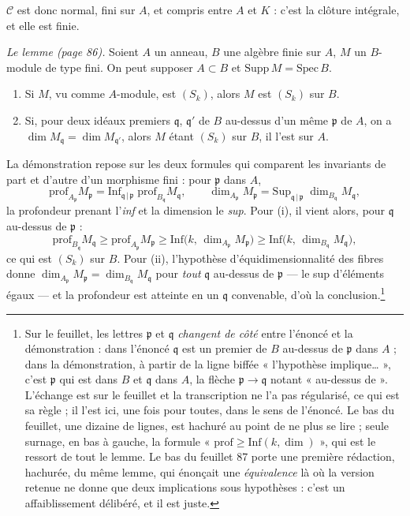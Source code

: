 \documentclass[11pt,a4paper]{article}
\begin{document}
$\mathcal{C}$ est donc normal, fini sur $A$, et compris entre $A$ et $K$ : c'est
la clôture intégrale, et elle est finie.

\emph{Le lemme (page 86).} Soient $A$ un anneau, $B$ une algèbre finie sur $A$,
$M$ un $B$-module de type fini. On peut supposer $A \subset B$ et
$\mathrm{Supp}\,M = \mathrm{Spec}\,B$.

\begin{enumerate}
  \item[(i)] Si $M$, vu comme $A$-module, est $(S_{k})$, alors $M$ est
  $(S_{k})$ sur $B$.
  \item[(ii)] Si, pour deux idéaux premiers $\mathfrak{q}$, $\mathfrak{q}'$ de
  $B$ au-dessus d'un même $\mathfrak{p}$ de $A$, on a $\dim M_{\mathfrak{q}} =
  \dim M_{\mathfrak{q}'}$, alors $M$ étant $(S_{k})$ sur $B$, il l'est sur $A$.
\end{enumerate}

La démonstration repose sur les deux formules qui comparent les invariants de
part et d'autre d'un morphisme fini : pour $\mathfrak{p}$ dans $A$,
\[
  \mathrm{prof}_{A_{\mathfrak{p}}} M_{\mathfrak{p}}
  = \mathrm{Inf}_{\mathfrak{q}\,|\,\mathfrak{p}}\;
    \mathrm{prof}_{B_{\mathfrak{q}}} M_{\mathfrak{q}} ,
  \qquad
  \dim_{A_{\mathfrak{p}}} M_{\mathfrak{p}}
  = \mathrm{Sup}_{\mathfrak{q}\,|\,\mathfrak{p}}\;
    \dim_{B_{\mathfrak{q}}} M_{\mathfrak{q}} ,
\]
la profondeur prenant l'\emph{inf} et la dimension le \emph{sup}. Pour (i), il
vient alors, pour $\mathfrak{q}$ au-dessus de $\mathfrak{p}$ :
\[
  \mathrm{prof}_{B_{\mathfrak{q}}} M_{\mathfrak{q}}
  \geqslant \mathrm{prof}_{A_{\mathfrak{p}}} M_{\mathfrak{p}}
  \geqslant \mathrm{Inf}\bigl(k,\, \dim_{A_{\mathfrak{p}}} M_{\mathfrak{p}}\bigr)
  \geqslant \mathrm{Inf}\bigl(k,\, \dim_{B_{\mathfrak{q}}} M_{\mathfrak{q}}\bigr) ,
\]
ce qui est $(S_{k})$ sur $B$. Pour (ii), l'hypothèse d'équidimensionnalité des
fibres donne $\dim_{A_{\mathfrak{p}}} M_{\mathfrak{p}} = \dim_{B_{\mathfrak{q}}}
M_{\mathfrak{q}}$ pour \emph{tout} $\mathfrak{q}$ au-dessus de $\mathfrak{p}$ —
le sup d'éléments égaux — et la profondeur est atteinte en un $\mathfrak{q}$
convenable, d'où la conclusion.\footnote{Sur le feuillet, les lettres
$\mathfrak{p}$ et $\mathfrak{q}$ \emph{changent de côté} entre l'énoncé et la
démonstration : dans l'énoncé $\mathfrak{q}$ est un premier de $B$ au-dessus de
$\mathfrak{p}$ dans $A$ ; dans la démonstration, à partir de la ligne biffée
« l'hypothèse implique… », c'est $\mathfrak{p}$ qui est dans $B$ et
$\mathfrak{q}$ dans $A$, la flèche $\mathfrak{p} \to \mathfrak{q}$ notant
« au-dessus de ». L'échange est sur le feuillet et la transcription ne l'a pas
régularisé, ce qui est sa règle ; il l'est ici, une fois pour toutes, dans le
sens de l'énoncé. Le bas du feuillet, une dizaine de lignes, est hachuré au
point de ne plus se lire ; seule surnage, en bas à gauche, la formule
« $\mathrm{prof} \geqslant \mathrm{Inf}(k, \dim)$ », qui est le ressort de tout
le lemme. Le bas du feuillet 87 porte une première rédaction, hachurée, du même
lemme, qui énonçait une \emph{équivalence} là où la version retenue ne donne que
deux implications sous hypothèses : c'est un affaiblissement délibéré, et il est
juste.}
\end{document}
